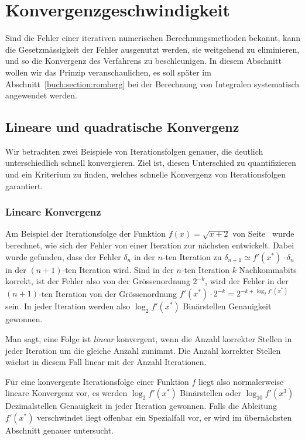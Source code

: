 %
%
%
\section{Konvergenzgeschwindigkeit
\label{buch:section:geschwidnigkeit}}
Sind die Fehler einer iterativen numerischen Berechnungsmethoden
bekannt, kann die Gesetzmässigkeit der Fehler ausgenutzt werden,
sie weitgehend zu eliminieren, und so die Konvergenz des Verfahrens
zu beschleunigen.
In diesem Abschnitt wollen wir das Prinzip veranschaulichen, es
soll später im Abschnitt~\ref{buch:section:romberg}
bei der Berechnung von Integralen systematisch angewendet werden.

%
%
\subsection{Lineare und quadratische Konvergenz
\label{buch:subsection:linearekonvergenz}}
Wir betrachten zwei Beispiele von Iterationsfolgen genauer, die
deutlich unterschiedlich schnell konvergieren.
Ziel ist, diesen Unterschied zu quantifizieren und ein Kriterium
zu finden, welches schnelle Konvergenz von Iterationsfolgen garantiert.

\subsubsection{Lineare Konvergenz}
Am Beispiel der Iterationsfolge der Funktion $f(x)=\sqrt{x+2}$
von Seite~\pageref{section:beispiel:sqrtiteration}
wurde berechnet, wie sich der Fehler von einer Iteration zur nächsten
entwickelt.
Dabei wurde gefunden, dass der Fehler $\delta_n$ in der $n$-ten Iteration
zu $\delta_{n+1}\simeq f'(x^*)\cdot\delta_n$ in der $(n+1)$-ten Iteration
wird.
Sind in der $n$-ten Iteration $k$ Nachkommabits korrekt, ist der Fehler
also von der Grössenordnung $2^{-k}$, wird der Fehler in der $(n+1)$-ten
Iteration von der Grössenordnung $f'(x^*) \cdot 2^{-k}= 2^{-k+\log_2f'(x^*)}$
sein.
In jeder Iteration werden also $\log_2f'(x^*)$ Binärstellen Genauigkeit
gewonnen.

Man sagt, eine Folge ist {\em linear} konvergent, wenn die Anzahl
korrekter Stellen in jeder Iteration um die gleiche Anzahl zunimmt.
Die Anzahl korrekter Stellen wächst in diesem Fall linear mit der
Anzahl Iterationen.

Für eine konvergente Iterationsfolge einer Funktion $f$ liegt also
normalerweise lineare Konvergenz vor, es werden $\log_2 f'(x^*)$
Binärstellen oder $\log_{10}f'(x^3)$ Dezimalstellen Genauigkeit in
jeder Iteration gewonnen.
Falls die Ableitung $f'(x^*)$ verschwindet liegt offenbar ein
Spezialfall vor, er wird im übernächsten Abschnitt genauer untersucht.

